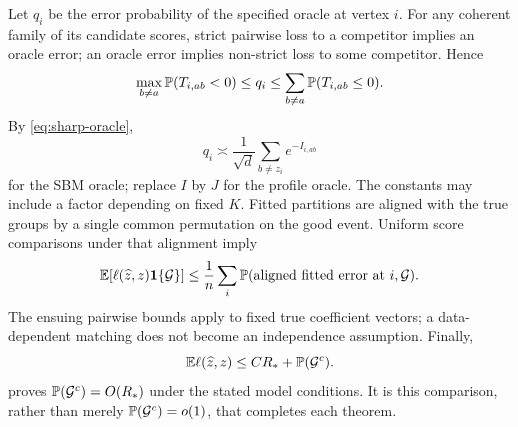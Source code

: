 Let $q_i$ be the error probability of the specified oracle at vertex $i$.
For any coherent family of its candidate scores, strict pairwise loss to a
competitor implies an oracle error; an oracle error implies non-strict
loss to some competitor. Hence
\[
 \max_{b\ne a}\mathbb P(T_{i,ab}<0)
 \le q_i\le\sum_{b\ne a}\mathbb P(T_{i,ab}\le0).
\]
By \eqref{eq:sharp-oracle},
\begin{equation}\label{eq:oracle-pairs}
 q_i\asymp\frac1{\sqrt d}\sum_{b\ne z_i}e^{-I_{i,ab}}
\end{equation}
for the SBM oracle; replace $I$ by $J$ for the profile oracle. The constants
may include a factor depending on fixed $K$.
Fitted partitions are aligned with the true groups by a single common
permutation on the good event. Uniform score comparisons under that
alignment imply
\[
 \mathbb E[\ell(\widehat z,z)\mathbf1\{\mathcal G\}]
 \le\frac1n\sum_i\mathbb P(\text{aligned fitted error at }i,\mathcal G).
\]
The ensuing pairwise bounds apply to fixed true coefficient vectors; a
data-dependent matching does not become an independence assumption.
Finally,
\begin{equation}\label{eq:bad-payment}
 \mathbb E\ell(\widehat z,z)
 \le C R_*+\mathbb P(\mathcal G^c).
\end{equation}
 proves $\mathbb P(\mathcal G^c)=O(R_*)$ under the stated
model conditions. It is this comparison, rather than merely
$\mathbb P(\mathcal G^c)=o(1)$, that completes each theorem.
